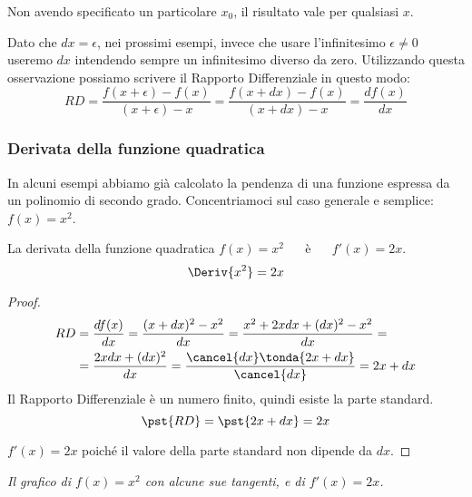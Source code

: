 \begin{osservazione}
Non avendo specificato un particolare \(x_0\), il risultato vale per 
qualsiasi \(x\).
\end{osservazione}

Dato che \(dx = \epsilon\), nei prossimi esempi, invece che usare 
l'infinitesimo \(\epsilon \neq 0\) useremo \(dx\) intendendo sempre un 
infinitesimo diverso da zero.
Utilizzando questa osservazione possiamo scrivere il 
Rapporto Differenziale in questo modo: 
\[RD = \dfrac{f(x +\epsilon) -f(x)}{(x +\epsilon) -x} = 
       \dfrac{f(x +dx) -f(x)}{(x +dx) -x} = 
       \dfrac{df(x)}{dx}\]

\pagebreak %

\subsubsection{Derivata della funzione quadratica}
\label{subsec:differenziazione_derivatafquadratica}
In alcuni esempi abbiamo già calcolato la pendenza di una funzione 
espressa da un polinomio di secondo grado. 
Concentriamoci sul caso generale e semplice: 
\(f(x)=x^2\).
\begin{teorema}
La derivata della funzione quadratica \(f(x)=x^2\) ~~ è ~~ \(f'(x)=2x\).
\[\Deriv{x^2}=2x\] 
\end{teorema}
\begin{proof}
\begin{align*}
RD &=\dfrac{df(x)}{dx}=\dfrac{(x+dx)^2-x^2}{dx}=
     \dfrac{x^2+2xdx+(dx)^2-x^2}{dx}=\\
   &=\dfrac{2xdx+(dx)^2}{dx}=
     \dfrac{\cancel{dx}\tonda{2x+dx}}{\cancel{dx}} = 2x+dx
\end{align*}
Il Rapporto Differenziale è un numero finito, quindi esiste la parte 
standard.
\[\pst{RD}=\pst{2x+dx}=2x\]

\vspace{-.7em} 
\hspace{15mm} 
\(f'(x) = 2x\) poiché il valore della parte standard non dipende da \(dx\).
\end{proof}

\begin{inaccessibleblock}
\hspace{-20mm}
\end{inaccessibleblock}
\label{img:diff_parabola_con_pendenze}
\begin{center} 
\emph{Il grafico di \(f(x)=x^2\) con alcune sue tangenti, e di \(f'(x)=2x\).}
\end{center}

